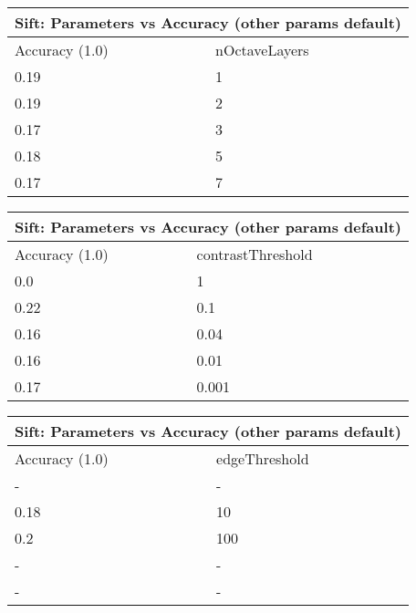 \documentclass[12pt]{article}
\begin{document}
    \vspace*{0.5cm}
    \begin{tabular}{ |p{1.5cm}||p{2cm}| }
        \hline
        \multicolumn{2}{|c|}{Sift: Parameters vs Accuracy (other params default)} \\
        \hline
        Accuracy (1.0) & nOctaveLayers \\
        \hline
        0.19 & 1 \\
        \hline
        0.19 & 2 \\
        \hline
        0.17 & 3 \\
        \hline
        0.18 & 5 \\
        \hline
        0.17 & 7 \\
        \hline
    \end{tabular}

    \vspace*{0.5cm}
    \begin{tabular}{ |p{1.5cm}||p{2cm}| }
        \hline
        \multicolumn{2}{|c|}{Sift: Parameters vs Accuracy (other params default)} \\
        \hline
        Accuracy (1.0) & contrastThreshold \\
        \hline
        0.0 & 1 \\
        \hline
        0.22 & 0.1 \\
        \hline
        0.16 & 0.04 \\
        \hline
        0.16 & 0.01 \\
        \hline
        0.17 & 0.001 \\
        \hline
    \end{tabular}

    \vspace*{0.5cm}
    \begin{tabular}{ |p{1.5cm}||p{2cm}| }
        \hline
        \multicolumn{2}{|c|}{Sift: Parameters vs Accuracy (other params default)} \\
        \hline
        Accuracy (1.0) & edgeThreshold \\
        \hline
        - & - \\
        \hline
        0.18 & 10 \\
        \hline
        0.2 & 100 \\
        \hline
        - & - \\
        \hline
        - & - \\
        \hline
    \end{tabular}
\end{document}
